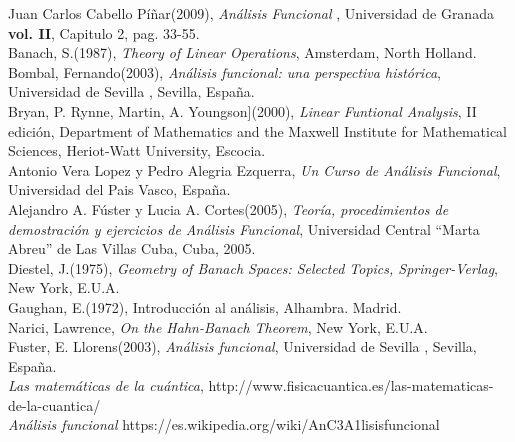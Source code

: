 \documentclass[10pt]{amsart}
\theoremstyle{remark}
\numberwithin{equation}{section}
\begin{document}
\newpage

\begin{thebibliography}{20}


 Juan Carlos Cabello Píñar(2009), \textit{Análisis Funcional} , Universidad de Granada \textbf{vol. II}, Capitulo 2, pag. 33-55.\\

Banach, S.(1987), \textit{Theory of Linear Operations}, Amsterdam, North Holland.\\

Bombal, Fernando(2003), \textit{Análisis funcional: una perspectiva histórica}, Universidad de Sevilla , Sevilla, España.\\

Bryan, P. Rynne, Martin, A. Youngson](2000), \textit{Linear Funtional Analysis}, II edición, Department of Mathematics and the Maxwell Institute for Mathematical Sciences, Heriot-Watt University, Escocia.\\

Antonio Vera Lopez y Pedro Alegria Ezquerra, \textit{Un Curso de Análisis Funcional}, Universidad del Pais Vasco, España.\\

Alejandro A. Fúster y Lucia A. Cortes(2005), \textit{Teoría, procedimientos de demostración y ejercicios de Análisis Funcional}, Universidad Central “Marta Abreu” de Las Villas Cuba, Cuba, 2005.\\

Diestel, J.(1975), \textit{Geometry of Banach Spaces: Selected Topics, Springer-Verlag}, New York, E.U.A.\\

Gaughan, E.(1972), Introducción al análisis, Alhambra. Madrid.\\

Narici, Lawrence, \textit{On the Hahn-Banach Theorem}, New York, E.U.A.\\

Fuster, E. Llorens(2003), \textit{Análisis funcional}, Universidad de Sevilla , Sevilla, España.\\

\textit{Las matemáticas de la cuántica}, http://www.fisicacuantica.es/las-matematicas-de-la-cuantica/\\

\textit{Análisis funcional}
https://es.wikipedia.org/wiki/AnC3A1lisisfuncional\\


\end{thebibliography}
\end{document}
